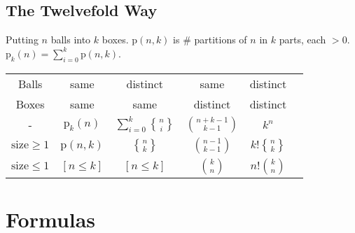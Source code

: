 \documentclass[8pt,a4paper,landscape,oneside]{amsart}
\DeclareRobustCommand{\stirling}{\genfrac\{\}{0pt}{}}
\begin{document}
\begin{multicols*}{3}
\subsection{The Twelvefold Way}
Putting $n$ balls into $k$ boxes.
$\mathrm{p}(n,k)$ is \# partitions of $n$ in $k$ parts, each $>0$.
$\mathrm{p}_k(n) = \sum_{i=0}^k \mathrm{p}(n,k)$.

\begin{tabular}{@{}c|c|c|c|c|l@{}}
	Balls & same & distinct & same & distinct\\
	Boxes & same & same & distinct & distinct\\
	\hline
	- & $\mathrm{p}_k(n)$ & $\sum_{i=0}^k \stirling{n}{i}$ & $\binom{n+k-1}{k-1}$ & $k^n$ \\ 
	$\mathrm{size}\ge 1$ & $\mathrm{p}(n,k)$ & $\stirling{n}{k}$ & $\binom{n-1}{k-1}$ & $k!\stirling{n}{k}$ \\
	$\mathrm{size}\le 1$ & $[n \le k]$ & $[n \le k]$ & $\binom{k}{n}$ & $n!\binom{k}{n}$ \\
	\bottomrule
\end{tabular}

\section{Formulas}



\end{multicols*}
\end{document}
